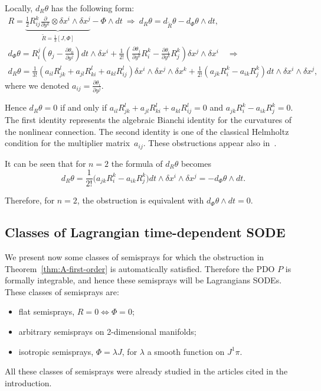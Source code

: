 \documentclass[pdftex]{sigma}
\begin{document}
\begin{remark}
Locally, $d_{R}\theta$ has the following form:
\begin{gather*}
R=\underbrace{\frac{1}{2}R_{ij}^{k}\frac{\partial}{\partial y^{k}}\otimes\delta x^{i}\wedge\delta x^{j}}_{\widetilde{R}=\frac{1}{3}[J,\Phi]}-\Phi\wedge dt \ \Rightarrow \ d_{R}\theta=d_{\widetilde{R}}\theta-d_{\Phi}\theta\wedge dt,
\\
d_{\Phi}\theta   =   R_{i}^{j}\left(\theta_{j}-\frac{\partial\theta_{0}}{\partial y^{j}}\right)dt\wedge\delta x^{i}+\frac{1}{2!}\left(\frac{\partial\theta_{j}}{\partial y^{k}}R_{i}^{k}-\frac{\partial\theta_{i}}{\partial y^{k}}R_{j}^{k}\right)\delta x^{j}\wedge\delta x^{i} \quad \Rightarrow\\
d_{R}\theta   =   \frac{1}{3!}\left(a_{il}R_{jk}^{l}+a_{jl}R_{ki}^{l}+a_{kl}R_{ij}^{l}\right)\delta x^{i}\wedge\delta x^{j}\wedge\delta x^{k}+\frac{1}{2!}\left(a_{jk}R_{i}^{k}-a_{ik}R_{j}^{k}\right)dt\wedge\delta x^{i}\wedge\delta x^{j},
\end{gather*}
where we denoted $a_{ij}=\frac{\partial\theta_{i}}{\partial y^{j}}$.

Hence $d_{R}\theta=0$ if and only if $a_{il}R_{jk}^{l}+a_{jl}R_{ki}^{l}+a_{kl}R_{ij}^{l}=0$
and $a_{jk}R_{i}^{k}-a_{ik}R_{j}^{k}=0$. The f\/irst identity represents
the algebraic Bianchi identity for the curvatures of the nonlinear
connection. The second identity is one of the classical Helmholtz
condition for the multiplier matrix~$a_{ij}$. These obstructions
appear also in~\cite{anderso92}.

It can be seen that for $n=2$ the formula of $d_{R}\theta$ becomes
\[
d_{R}\theta=\frac{1}{2!}\big(a_{jk}R_{i}^{k}-a_{ik}R_{j}^{k}\big)dt\wedge\delta x^{i}\wedge\delta x^{j}=-d_{\Phi}\theta\wedge dt.\]


Therefore, for $n=2$, the obstruction is
equivalent with $d_{\Phi}\theta\wedge dt=0$.
\end{remark}

\subsection{Classes of Lagrangian time-dependent SODE}\label{section3.3}

We present now some classes of semisprays for which the obstruction
in Theorem~\ref{thm:A-first-order} is auto\-ma\-ti\-cally satisf\/ied. Therefore
the PDO $P$ is formally integrable, and hence these semisprays will
be Lagrangians SODEs. These classes of semisprays are:
\begin{itemize}\itemsep=0pt
\item f\/lat semisprays, $R=0\Leftrightarrow\Phi=0$;
\item arbitrary semisprays on 2-dimensional manifolds;
\item isotropic semisprays, $\Phi=\lambda J$, for $\lambda$ a smooth function
on $J^{1}\pi$.
\end{itemize}
All these classes of semisprays were already studied in the articles
cited in the introduction.
\end{document}
